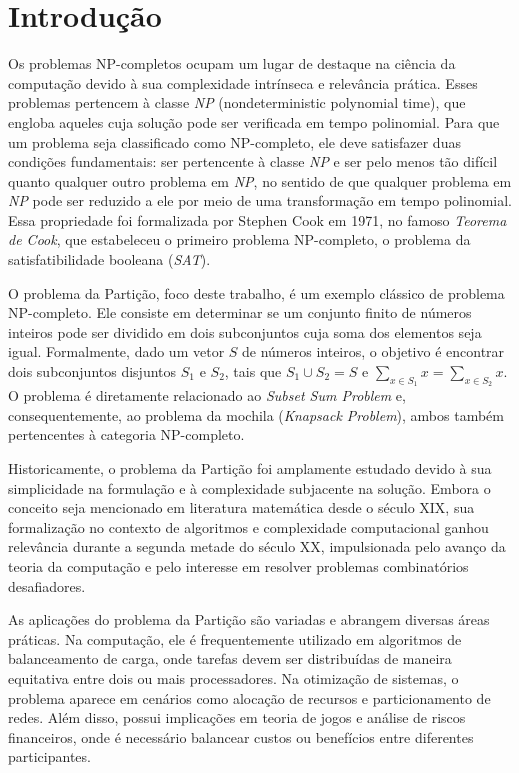 \documentclass{article}
\begin{document}


\newpage
\thispagestyle{empty}
\tableofcontents

\newpage
\large %

\section{Introdução}

Os problemas NP-completos ocupam um lugar de destaque na ciência da computação devido à sua complexidade intrínseca e relevância prática. Esses problemas pertencem à classe \emph{NP} (nondeterministic polynomial time), que engloba aqueles cuja solução pode ser verificada em tempo polinomial. Para que um problema seja classificado como NP-completo, ele deve satisfazer duas condições fundamentais: ser pertencente à classe \emph{NP} e ser pelo menos tão difícil quanto qualquer outro problema em \emph{NP}, no sentido de que qualquer problema em \emph{NP} pode ser reduzido a ele por meio de uma transformação em tempo polinomial. Essa propriedade foi formalizada por Stephen Cook em 1971, no famoso \emph{Teorema de Cook}, que estabeleceu o primeiro problema NP-completo, o problema da satisfatibilidade booleana (\emph{SAT}).

O problema da Partição, foco deste trabalho, é um exemplo clássico de problema NP-completo. Ele consiste em determinar se um conjunto finito de números inteiros pode ser dividido em dois subconjuntos cuja soma dos elementos seja igual. Formalmente, dado um vetor \( S \) de números inteiros, o objetivo é encontrar dois subconjuntos disjuntos \( S_1 \) e \( S_2 \), tais que \( S_1 \cup S_2 = S \) e \( \sum_{x \in S_1} x = \sum_{x \in S_2} x \). O problema é diretamente relacionado ao \emph{Subset Sum Problem} e, consequentemente, ao problema da mochila (\emph{Knapsack Problem}), ambos também pertencentes à categoria NP-completo.

Historicamente, o problema da Partição foi amplamente estudado devido à sua simplicidade na formulação e à complexidade subjacente na solução. Embora o conceito seja mencionado em literatura matemática desde o século XIX, sua formalização no contexto de algoritmos e complexidade computacional ganhou relevância durante a segunda metade do século XX, impulsionada pelo avanço da teoria da computação e pelo interesse em resolver problemas combinatórios desafiadores.

As aplicações do problema da Partição são variadas e abrangem diversas áreas práticas. Na computação, ele é frequentemente utilizado em algoritmos de balanceamento de carga, onde tarefas devem ser distribuídas de maneira equitativa entre dois ou mais processadores. Na otimização de sistemas, o problema aparece em cenários como alocação de recursos e particionamento de redes. Além disso, possui implicações em teoria de jogos e análise de riscos financeiros, onde é necessário balancear custos ou benefícios entre diferentes participantes.
\end{document}
